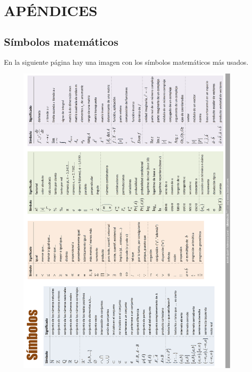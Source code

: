 \part{APÉNDICES}
\chapter{Símbolos matemáticos} \label{simbolosmat}

\vspace{25mm}

En la siguiente página hay una imagen con los símbolos matemáticos más usados.

\vspace{45mm}
\justify

\clearpage

\begin{figure}[H]
	\centering
	\includegraphics[width=1\textwidth]{imagenes/apendices/APENDICESIM00.png}
\end{figure}


